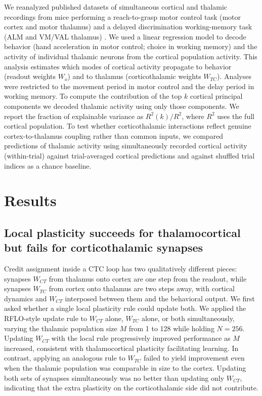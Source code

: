 \documentclass[11pt]{article}
\begin{document}
We reanalyzed published datasets of simultaneous cortical and thalamic
recordings from mice performing a reach-to-grasp motor control task
(motor cortex and motor thalamus) \cite{sauerbrei2020cortical} and a
delayed discrimination working-memory task (ALM and VM/VAL thalamus)
\cite{guo2017maintenance}. We used a linear regression model to decode
behavior (hand acceleration in motor control; choice in working
memory) and the activity of individual thalamic neurons from the
cortical population activity. This analysis estimates which modes of
cortical activity propagate to behavior (readout weights $W_o$) and to
thalamus (corticothalamic weights $W_{TC}$). Analyses were restricted
to the movement period in motor control and the delay period in
working memory. To compute the contribution of the top $k$ cortical
principal components we decoded thalamic activity using only those
components. We report the fraction of explainable variance as
$R^2(k)/R^2$, where $R^2$ uses the full cortical population. To test
whether corticothalamic interactions reflect genuine cortex-to-thalamus
coupling rather than common inputs, we compared predictions of thalamic
activity using simultaneously recorded cortical activity (within-trial)
against trial-averaged cortical predictions and against shuffled trial
indices as a chance baseline.

\section{Results}

\subsection{Local plasticity succeeds for thalamocortical but fails for corticothalamic synapses}
\label{sec:local}

Credit assignment inside a CTC loop has two qualitatively different
pieces: synapses $W_{CT}$ from thalamus onto cortex are one step from
the readout, while synapses $W_{TC}$ from cortex onto thalamus are two
steps away, with cortical dynamics and $W_{CT}$ interposed between
them and the behavioral output. We first asked whether a single local
plasticity rule could update both. We applied the RFLO-style update
rule to $W_{CT}$ alone, $W_{TC}$ alone, or both simultaneously,
varying the thalamic population size $M$ from 1 to 128 while holding
$N = 256$. Updating $W_{CT}$ with the local rule
progressively improved performance as $M$ increased, consistent with
thalamocortical plasticity facilitating learning. In contrast,
applying an analogous rule to $W_{TC}$ failed to yield improvement
even when the thalamic population was comparable in size to the
cortex. Updating both sets of synapses simultaneously was no better
than updating only $W_{CT}$, indicating that the extra plasticity on
the corticothalamic side did not contribute.
\end{document}
